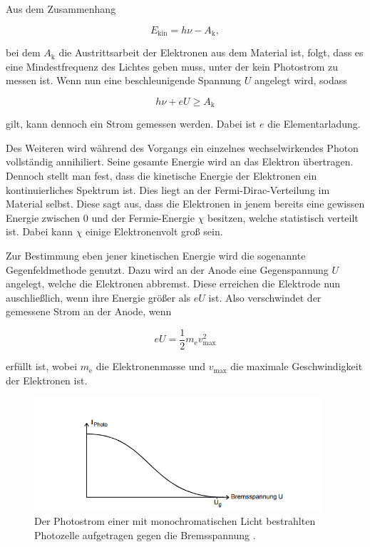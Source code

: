 Aus dem Zusammenhang

\begin{equation}
    \label{eqn:elek-energie}
    E_\text{kin} = h \nu - A_\text{k},
\end{equation}

bei dem $A_\text{k}$ die Austrittsarbeit der Elektronen aus dem Material ist,
folgt, dass es eine Mindestfrequenz des Lichtes geben muss, unter der kein Photostrom zu messen ist.
Wenn nun eine beschleunigende Spannung $U$ angelegt wird, sodass

\begin{equation}
    \label{eqn:besch}
    h \nu + e U \geq A_\text{k}
\end{equation}

gilt, kann dennoch ein Strom gemessen werden. Dabei ist $e$ die Elementarladung.

Des Weiteren wird während des Vorgangs ein einzelnes wechselwirkendes Photon vollständig annihiliert.
Seine gesamte Energie wird an das Elektron übertragen.
Dennoch stellt man fest, dass die kinetische Energie der Elektronen ein kontinuierliches Spektrum ist.
Dies liegt an der Fermi-Dirac-Verteilung im Material selbst. Diese sagt aus,
dass die Elektronen in jenem bereits eine gewissen Energie zwischen $0$ und der Fermie-Energie $\chi$ besitzen,
welche statistisch verteilt ist. Dabei kann $\chi$ einige Elektronenvolt groß sein.

Zur Bestimmung eben jener kinetischen Energie wird die sogenannte Gegenfeldmethode genutzt.
Dazu wird an der Anode eine Gegenspannung $U$ angelegt, welche die Elektronen abbremst.
Diese erreichen die Elektrode nun auschließlich, wenn ihre Energie größer als $e U$ ist.
Also verschwindet der gemessene Strom an der Anode, wenn

\begin{equation}
    \label{eqn:gegenfeld}
    e U = \frac{1}{2} m_\text{e} v_\text{max}^2
\end{equation}

erfüllt ist, wobei $m_\text{e}$ die Elektronenmasse und $v_\text{max}$ die maximale Geschwindigkeit der Elektronen ist.

\begin{figure}
  \centering
  \includegraphics[width=0.95\textwidth]{content/brems-photo.png}
  \caption{Der Photostrom einer mit monochromatischen Licht bestrahlten Photozelle aufgetragen gegen die Bremsspannung \cite{V500}.}
  \label{fig:brems-photo}
\end{figure}

